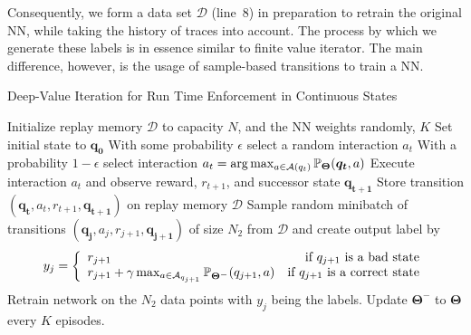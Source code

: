 Consequently, we form a data set $\mathcal{D}$  (line~8)  in preparation to retrain the original NN, while taking the history of traces into account. The process by which we generate these labels is in essence similar to finite value iterator. The main difference, however, is the usage of sample-based transitions to train a NN.  
\begin{algorithm}[h!]
\caption{Deep-Value Iteration for Run Time Enforcement in Continuous States}
\label{Algo:VI2}
\begin{algorithmic}[1]
\STATE Initialize replay memory $\mathcal{D}$ to capacity $N$, and the NN weights randomly, $K$
\STATE Set initial state to $ \bm{q_{0}}$
\STATE With some probability $\epsilon$ select a random interaction $a_{t}$
\STATE With a probability $1 - \epsilon$ select interaction $a_{t} = \arg\max_{a\in {\cal A}(q_t)}\mathbb{P}_{\bm{\Theta}}( \bm{q_t},a)$
\STATE Execute interaction $a_{t}$ and observe reward, $r_{t+1}$, and successor state $ \bm{q_{t+1}}$
\STATE Store transition $\left( \bm{q_{t}}, a_{t}, r_{t+1},  \bm{q_{t+1}}\right)$ on replay memory $\mathcal{D}$
\STATE Sample random minibatch of transitions $\left( \bm{q_{j}}, a_{j}, r_{j+1},  \bm{q_{j+1}}\right)$ of size $N_{2}$ from $\mathcal{D}$ and create output label by 
\begin{displaymath}
   y_{j} = \left\{
     \begin{array}{lr}
       r_{j+1} & \text{if $q_{j+1}$ is a bad state}\\
        r_{j+1} + \gamma \max_{a \in {\cal A}_{q_{j+1}}} \mathbb{P}_{\bm{\Theta^{-}}}(q_{j+1},a)  & \text{if $q_{j+1}$ is a correct state}
     \end{array}
   \right.
\end{displaymath} 
\ENDFOR
\STATE Retrain network on the $N_{2}$ data points with $y_{j}$ being the labels. 
\STATE Update ${\bm{\Theta^{-}}}$ to ${\bm{\Theta}}$ every $K$ episodes.
\ENDFOR
\end{algorithmic}
\end{algorithm}




